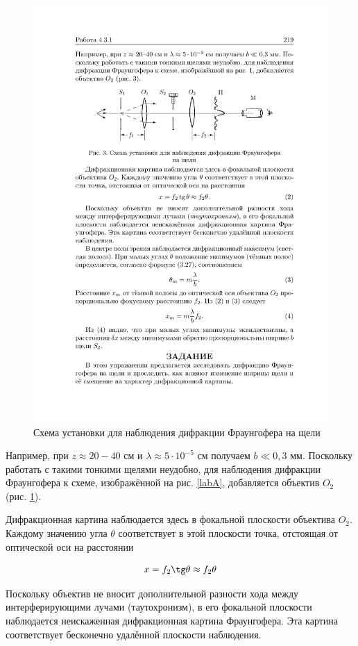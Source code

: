 \documentclass[a4paper,12pt]{article} %
\begin{document}
\begin{figure}[h!]
	\centering
	\includegraphics[width=0.8\linewidth]{b.pdf}
	\caption{Схема установки для наблюдения дифракции Фраунгофера на щели}
	\label{labB}
\end{figure}

Например, при $ z \approx  20-40 $  см и $  \lambda \approx 5 \cdot 10^{-5}  $   см получаем $  b \ll 0,3 $ мм. Поскольку работать с такими тонкими щелями неудобно, для наблюдения дифракции Фраунгофера к схеме, изображённой на рис. \ref{labA}, добавляется объектив $ O_2  $ (рис. \ref{labB}).

Дифракционная картина наблюдается здесь в фокальной плоскости
объектива $ O_2 $. Каждому значению угла $ \theta $ соответствует в этой плоскости точка, отстоящая от оптической оси на расстоянии

\begin{equation}\label{x}
x = f_2 \tg \theta \approx f_2 \theta
\end{equation}

Поскольку объектив не вносит дополнительной разности хода
между интерферирующими лучами (таутохронизм), в его фокальной
плоскости наблюдается неискаженная дифракционная картина Фраунгофера. Эта картина соответствует бесконечно удалённой плоскости
наблюдения.
\end{document}

